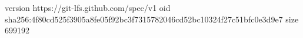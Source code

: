 version https://git-lfs.github.com/spec/v1
oid sha256:4f80cd525f3905a8fe05f92bc3f7315782046cd52bc10324f27c51bfc0e3d9e7
size 699192
